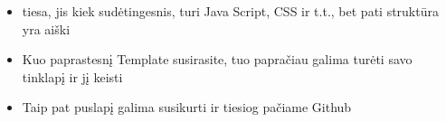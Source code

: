 \documentclass[11pt,a4paper]{article}
\begin{document}
\begin{enumerate}
\begin{itemize}
\begin{figure}[H]
\center
{}
\end{figure}

\item tiesa, jis kiek sudėtingesnis, turi Java Script, CSS ir t.t., bet pati struktūra yra aiški
\item Kuo paprastesnį Template susirasite, tuo papračiau galima turėti savo tinklapį ir jį keisti
\item Taip pat puslapį galima susikurti ir tiesiog pačiame Github

\end{itemize}













\end{enumerate}
\end{document}
